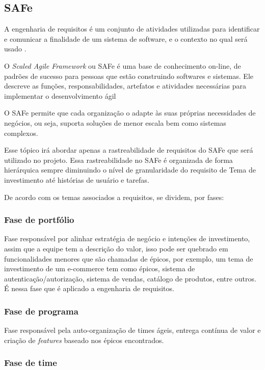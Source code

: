 \subsection{SAFe}

A engenharia de requisitos é um conjunto de atividades utilizadas para identificar e comunicar a finalidade de um sistema de software, e o contexto no qual será usado \cite{leffingwell}.

O \textit{Scaled Agile Framework} ou SAFe é uma base de conhecimento on-line, de padrões de sucesso para pessoas que estão
construindo softwares e sistemas. Ele descreve as funções, responsabilidades, artefatos e atividades necessárias para
implementar o desenvolvimento ágil \cite{safe}

O SAFe permite que cada organização o adapte às suas próprias necessidades de negócios, ou seja, suporta soluções de menor escala bem como sistemas complexos.

Esse tópico irá abordar apenas a rastreabilidade de requisitos do SAFe que será utilizado no projeto. Essa
rastreabilidade no SAFe é organizada de forma hierárquica sempre diminuindo o nível de granularidade do requisito de
Tema de investimento até histórias de usuário e tarefas.

De acordo com \cite{safe} os temas associados a requisitos, se dividem, por fases:

\subsubsection{Fase de portfólio}

Fase responsável por alinhar estratégia de negócio e intenções de investimento, assim que a equipe tem a descrição do
valor, isso pode ser quebrado em funcionalidades menores que são chamadas de épicos, por exemplo, um tema de
investimento de um e-commerce tem como épicos, sistema de autenticação/autorização, sistema de vendas, catálogo de
produtos, entre outros. É nessa fase que é aplicado a engenharia de requisitos.

\subsubsection{Fase de programa}

Fase responsável pela auto-organização de times ágeis, entrega contínua de valor e criação de \textit{features} baseado nos épicos encontrados.

\subsubsection{Fase de time}

